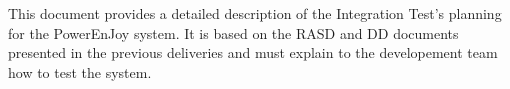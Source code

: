 This document provides a detailed description of the Integration Test's planning for the PowerEnJoy system. It is based on the RASD and DD documents presented in the previous deliveries and must explain to the developement team how to test the system.
